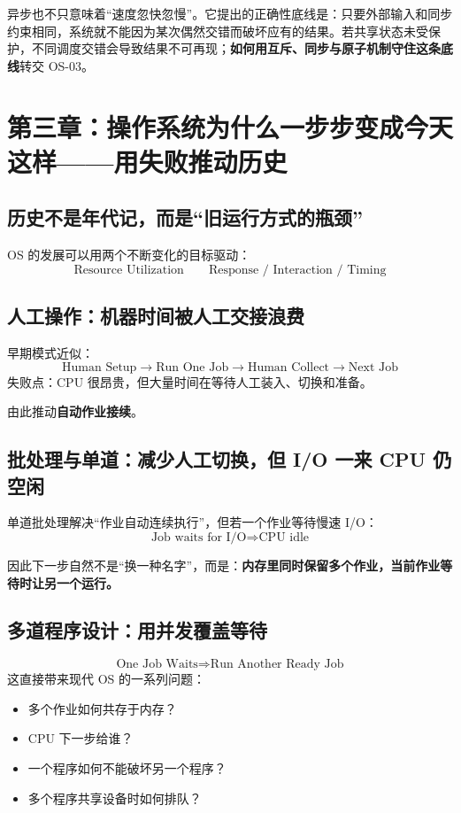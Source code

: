 \documentclass[11pt,a4paper]{ctexart}
\newcommand{\kw}[1]{\textbf{#1}}
\begin{document}
异步也不只意味着“速度忽快忽慢”。它提出的正确性底线是：只要外部输入和同步约束相同，系统就不能因为某次偶然交错而破坏应有的结果。若共享状态未受保护，不同调度交错会导致结果不可再现；\kw{如何用互斥、同步与原子机制守住这条底线}转交 OS-03。

\section{第三章：操作系统为什么一步步变成今天这样——用失败推动历史}

\subsection{历史不是年代记，而是“旧运行方式的瓶颈”}

OS 的发展可以用两个不断变化的目标驱动：
\[
\boxed{\text{Resource Utilization}}\qquad\boxed{\text{Response / Interaction / Timing}}
\]

\subsection{人工操作：机器时间被人工交接浪费}

早期模式近似：
\[
\text{Human Setup}\rightarrow\text{Run One Job}\rightarrow\text{Human Collect}\rightarrow\text{Next Job}
\]
失败点：CPU 很昂贵，但大量时间在等待人工装入、切换和准备。

由此推动\kw{自动作业接续}。

\subsection{批处理与单道：减少人工切换，但 I/O 一来 CPU 仍空闲}

单道批处理解决“作业自动连续执行”，但若一个作业等待慢速 I/O：
\[
\boxed{\text{Job waits for I/O}\Rightarrow\text{CPU idle}}
\]

因此下一步自然不是“换一种名字”，而是：\kw{内存里同时保留多个作业，当前作业等待时让另一个运行。}

\subsection{多道程序设计：用并发覆盖等待}

\[
\boxed{
\text{One Job Waits}
\Rightarrow
\text{Run Another Ready Job}
}
\]
这直接带来现代 OS 的一系列问题：
\begin{itemize}
  \item 多个作业如何共存于内存？
  \item CPU 下一步给谁？
  \item 一个程序如何不能破坏另一个程序？
  \item 多个程序共享设备时如何排队？
\end{itemize}
\end{document}
